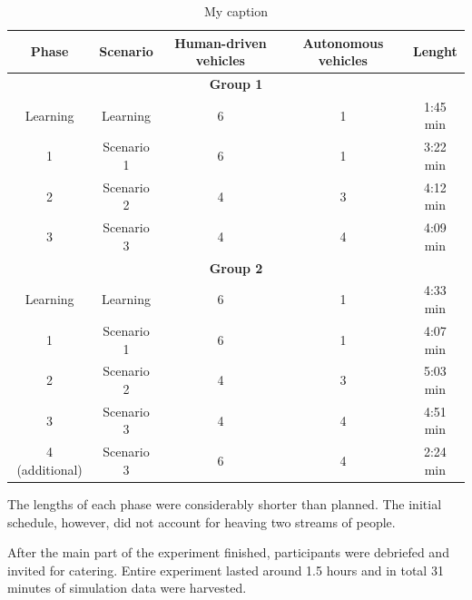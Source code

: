 \documentclass[11pt,english]{article}
\begin{document}
\begin{table}[h]
\centering
\begin{tabular}{|c|c|c|c|c|}
\hline
\textbf{Phase} & \textbf{Scenario} & \textbf{Human-driven vehicles} & \textbf{Autonomous vehicles} & \textbf{Lenght} \\ \hline
\multicolumn{5}{|c|}{\textbf{Group 1}}                                                                               \\ \hline
Learning       & Learning          & 6                              & 1                            & 1:45 min        \\ \hline
1              & Scenario 1        & 6                              & 1                            & 3:22 min        \\ \hline
2              & Scenario 2        & 4                              & 3                            & 4:12 min        \\ \hline
3              & Scenario 3        & 4                              & 4                            & 4:09 min        \\ \hline
\multicolumn{5}{|c|}{\textbf{Group 2}}                                                                               \\ \hline
Learning       & Learning          & 6                              & 1                            & 4:33 min        \\ \hline
1              & Scenario 1        & 6                              & 1                            & 4:07 min        \\ \hline
2              & Scenario 2        & 4                              & 3                            & 5:03 min        \\ \hline
3              & Scenario 3        & 4                              & 4                            & 4:51 min        \\ \hline
4 (additional) & Scenario 3        & 6                              & 4                            & 2:24 min        \\ \hline
\end{tabular}
\caption{My caption}
\label{table:minutes_table}
\end{table}

The lengths of each phase were considerably shorter than planned. The initial schedule, however, did not account for heaving two streams of people. 


After the main part of the experiment finished, participants were debriefed and invited for catering. Entire experiment lasted around 1.5 hours and in total 31 minutes of simulation data were harvested.
\end{document}
